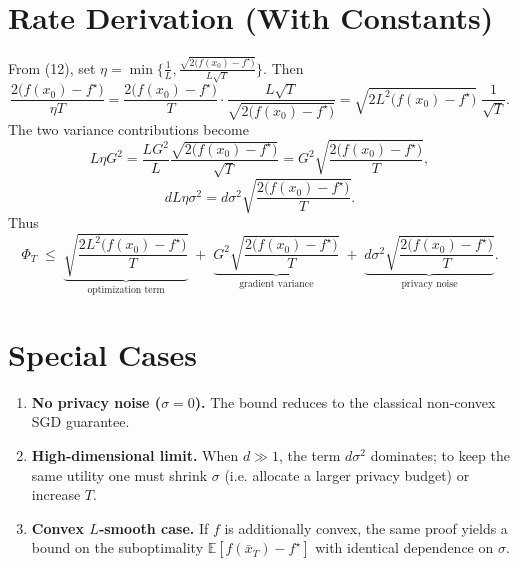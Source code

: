 \documentclass{article}
\newcommand{\E}{\mathbb{E}}
\begin{document}
\section*{Rate Derivation (With Constants)}
From (12), set $\eta = \min\big\{\frac{1}{L},\frac{\sqrt{2\big(f(x_{0})-f^{\star}\big)}}{L\sqrt{T}}\big\}$.  
Then
\[
\frac{2\big(f(x_{0})-f^{\star}\big)}{\eta T}
   = \frac{2\big(f(x_{0})-f^{\star}\big)}{T}
     \cdot\frac{L\sqrt{T}}{\sqrt{2\big(f(x_{0})-f^{\star}\big)}}
   = \sqrt{2L^{2}\big(f(x_{0})-f^{\star}\big)}\;\frac{1}{\sqrt{T}}.
\]
The two variance contributions become
\[
L\eta G^{2}= \frac{L G^{2}}{L}\frac{\sqrt{2\big(f(x_{0})-f^{\star}\big)}}{\sqrt{T}}
           = G^{2}\sqrt{ \frac{2\big(f(x_{0})-f^{\star}\big)}{T}},
\]
\[
dL\eta\sigma^{2}= d\sigma^{2}\sqrt{ \frac{2\big(f(x_{0})-f^{\star}\big)}{T}}.
\]
Thus
\[
\Phi_{T}\;\le\;
\underbrace{\sqrt{\frac{2L^{2}\big(f(x_{0})-f^{\star}\big)}{T}}}_{\text{optimization term}}
\;+\;
\underbrace{G^{2}\sqrt{\frac{2\big(f(x_{0})-f^{\star}\big)}{T}}}_{\text{gradient variance}}
\;+\;
\underbrace{d\sigma^{2}\sqrt{\frac{2\big(f(x_{0})-f^{\star}\big)}{T}}}_{\text{privacy noise}}.
\]

\section*{Special Cases}
\begin{enumerate}[label=\alph*)]
\item \textbf{No privacy noise ($\sigma=0$).} The bound reduces to the classical non‑convex SGD guarantee.
\item \textbf{High‑dimensional limit.} When $d\gg 1$, the term $d\sigma^{2}$ dominates; to keep the same utility one must shrink $\sigma$ (i.e. allocate a larger privacy budget) or increase $T$.
\item \textbf{Convex $L$‑smooth case.} If $f$ is additionally convex, the same proof yields a bound on the suboptimality $ \E[f(\bar{x}_{T})-f^{\star}]$ with identical dependence on $\sigma$.
\end{enumerate}
\end{document}
